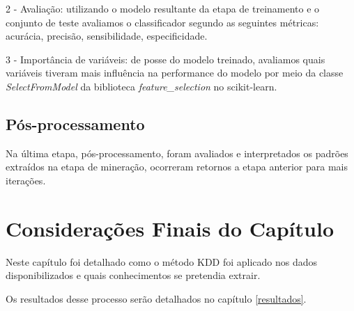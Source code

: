 2 - Avaliação: utilizando o modelo resultante da etapa de treinamento e o
conjunto de teste avaliamos o classificador segundo as seguintes métricas:
acurácia, precisão, sensibilidade, especificidade.

3 - Importância de variáveis: de posse do modelo treinado, avaliamos quais
variáveis tiveram mais influência na performance do modelo por meio da classe
\textit{SelectFromModel} da biblioteca \textit{feature\_selection} no
scikit-learn.

\subsection{Pós-processamento}

Na última etapa, pós-processamento, foram avaliados e interpretados os padrões
extraídos na etapa de mineração, ocorreram retornos a etapa anterior para mais
iterações.

\section{Considerações Finais do Capítulo}

Neste capítulo foi detalhado como o método KDD foi aplicado nos dados disponibilizados e quais conhecimentos se pretendia extrair.

Os resultados desse processo serão detalhados no capítulo \ref{resultados}.
